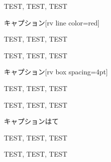 \begin{rv@ascolorbox2@nocaption}

TEST, TEST, TEST

\end{rv@ascolorbox2@nocaption}

\begin{rv@ascolorbox3@caption}{キャプション}[rv line color=red]

TEST, TEST, TEST

\end{rv@ascolorbox3@caption}

\begin{rv@ascolorbox3@nocaption}[rv dummy caption=ほげほげほげほげ, rv line color=red]

TEST, TEST, TEST

\end{rv@ascolorbox3@nocaption}

\begin{rv@ascolorbox4@caption}{キャプション}[rv box spacing=4pt]

TEST, TEST, TEST

\end{rv@ascolorbox4@caption}

\begin{rv@ascolorbox4@nocaption}

TEST, TEST, TEST

\end{rv@ascolorbox4@nocaption}

\begin{rv@ascolorbox5@caption}{キャプションはて}

TEST, TEST, TEST

\end{rv@ascolorbox5@caption}

\begin{rv@ascolorbox5@nocaption}

TEST, TEST, TEST

\end{rv@ascolorbox5@nocaption}

% 
% 
% 
% 
% 
% 
% 
% 

